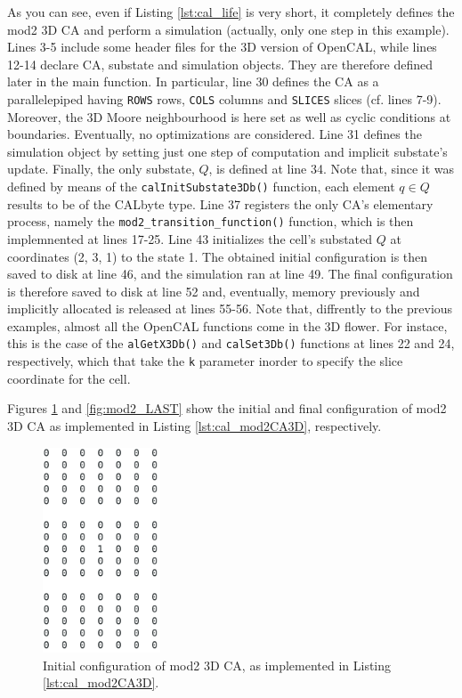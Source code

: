 As you can see, even if Listing \ref{lst:cal_life} is very short, it
completely defines the mod2 3D CA and perform a simulation (actually,
only one step in this example). Lines 3-5 include some header files
for the 3D version of OpenCAL, while lines 12-14 declare CA, substate
and simulation objects. They are therefore defined later in the main
function. In particular, line 30 defines the CA as a parallelepiped
having \verb'ROWS' rows, \verb'COLS' columns and \verb'SLICES' slices
(cf. lines 7-9). Moreover, the 3D Moore neighbourhood is here set as
well as cyclic conditions at boundaries. Eventually, no optimizations
are considered. Line 31 defines the simulation object by setting just
one step of computation and implicit substate's update. Finally, the
only substate, $Q$, is defined at line 34. Note that, since it was
defined by means of the \verb'calInitSubstate3Db()' function, each
element $q \in Q$ results to be of the CALbyte type. Line 37 registers
the only CA's elementary process, namely the
\verb'mod2_transition_function()' function, which is then implemnented
at lines 17-25. Line 43 initializes the cell's substated $Q$ at
coordinates (2, 3, 1) to the state 1. The obtained initial
configuration is then saved to disk at line 46, and the simulation ran
at line 49. The final configuration is therefore saved to disk at line
52 and, eventually, memory previously and implicitly allocated is
released at lines 55-56. Note that, diffrently to the previous
examples, almost all the OpenCAL functions come in the 3D flower. For
instace, this is the case of the \verb'alGetX3Db()' and
\verb'calSet3Db()' functions at lines 22 and 24, respectively, which
that take the \verb'k' parameter inorder to specify the slice
coordinate for the cell.

Figures \ref{fig:mod2_0000} and \ref{fig:mod2_LAST} show the initial and final configuration of mod2 3D CA as implemented in Listing \ref{lst:cal_mod2CA3D}, respectively.

\begin{figure}
  \begin{center}
    \includegraphics[width=3.5cm]{./images/OpenCAL/mod2_0000}
    \caption{Initial configuration of mod2 3D CA, as implemented in Listing \ref{lst:cal_mod2CA3D}.}
    \label{fig:mod2_0000}
  \end{center}
\end{figure}


